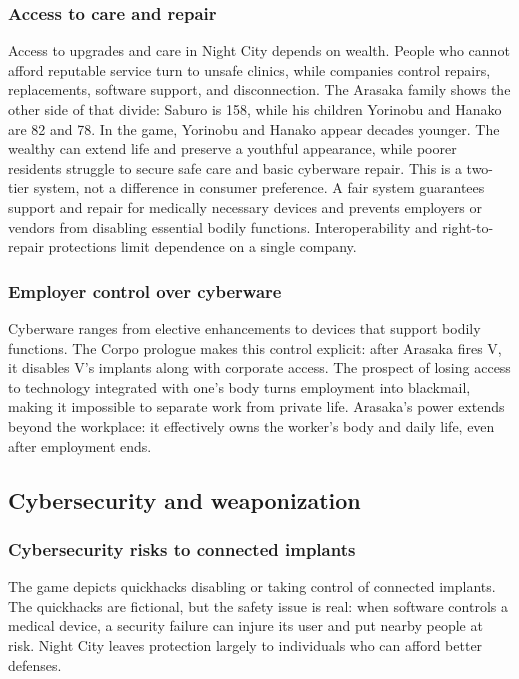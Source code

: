 \documentclass{article}%
\begin{document}
\subsubsection{Access to care and repair}
Access to upgrades and care in Night City depends on wealth. People who cannot afford reputable service turn to unsafe clinics, while companies control repairs, replacements, software support, and disconnection. The Arasaka family shows the other side of that divide: Saburo is 158, while his children Yorinobu and Hanako are 82 and 78. In the game, Yorinobu and Hanako appear decades younger. The wealthy can extend life and preserve a youthful appearance, while poorer residents struggle to secure safe care and basic cyberware repair. This is a two-tier system, not a difference in consumer preference. A fair system guarantees support and repair for medically necessary devices and prevents employers or vendors from disabling essential bodily functions. Interoperability and right-to-repair protections limit dependence on a single company.

\subsubsection{Employer control over cyberware}
Cyberware ranges from elective enhancements to devices that support bodily functions. The Corpo prologue makes this control explicit: after Arasaka fires V, it disables V's implants along with corporate access. The prospect of losing access to technology integrated with one's body turns employment into blackmail, making it impossible to separate work from private life. Arasaka's power extends beyond the workplace: it effectively owns the worker's body and daily life, even after employment ends.

\subsection{Cybersecurity and weaponization}
\subsubsection{Cybersecurity risks to connected implants}
The game depicts quickhacks disabling or taking control of connected implants. The quickhacks are fictional, but the safety issue is real: when software controls a medical device, a security failure can injure its user and put nearby people at risk. Night City leaves protection largely to individuals who can afford better defenses.
\end{document}
